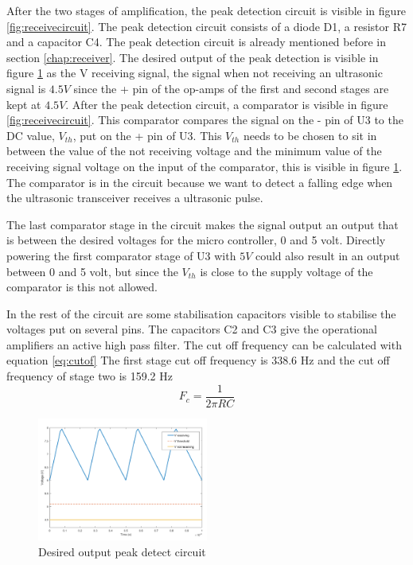 After the two stages of amplification, the peak detection circuit is visible in figure \ref{fig:receivecircuit}. The peak detection circuit consists of a diode D1, a resistor R7 and a capacitor C4. The peak detection circuit is already mentioned before in section \ref{chap:receiver}. The desired output of the peak detection is visible in figure \ref{fig:waves_peak_detect} as the V receiving signal, the signal when not receiving an ultrasonic signal is $4.5V$ since the + pin of the op-amps of the first and second stages are kept at $4.5V$.
After the peak detection circuit, a comparator is visible in figure \ref{fig:receivecircuit}. This comparator compares the signal on the - pin of U3 to the DC value, $V_{th}$, put on the + pin of U3. This $V_{th}$ needs to be chosen to sit in between the value of the not receiving voltage and the minimum value of the receiving signal voltage on the input of the comparator, this is visible in figure \ref{fig:waves_peak_detect}. The comparator is in the circuit because we want to detect a falling edge when the ultrasonic transceiver receives a ultrasonic pulse.

The last comparator stage in the circuit makes the signal output an output that is between the desired voltages for the micro controller, 0 and 5 volt. Directly powering the first comparator stage of U3 with $5V$ could also result in an output between 0 and 5 volt, but since the $V_{th}$ is close to the supply voltage of the comparator is this not allowed.

In the rest of the circuit are some stabilisation capacitors visible to stabilise the voltages put on several pins. The capacitors C2 and C3 give the operational amplifiers an active high pass filter. The cut off frequency can be calculated with equation \ref{eq:cutof}
The first stage cut off frequency is 338.6 Hz and the cut off frequency of stage two is 159.2 Hz
\begin{equation}
\label{eq:cutof}
F_{c}= \frac{1}{2\pi RC}
\end{equation}

\begin{figure}[H]
\centering
\includegraphics[width=0.5\textwidth]{Figures/waves_peak_detect.png}
\caption{Desired output peak detect circuit}
\label{fig:waves_peak_detect}
\end{figure}


